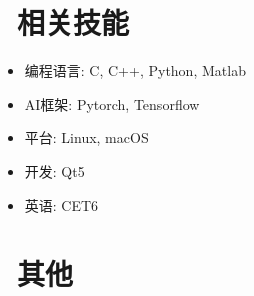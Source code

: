 \documentclass{resume}
\begin{document}

\section{\faCogs\ 相关技能}
\begin{itemize}[parsep=0.5ex]
  \item 编程语言: C, C++, Python, Matlab
  \item AI框架: Pytorch, Tensorflow
  \item 平台: Linux, macOS
  \item 开发: Qt5
  \item 英语: CET6
\end{itemize}

\section{\faInfo\ 其他}

%
%
\end{document}
